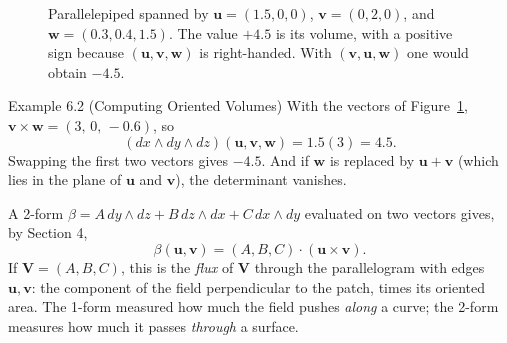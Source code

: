 \documentclass[11pt,letterpaper]{article}
\newcommand{\manualsubsection}[1]{%
  \Needspace{5\baselineskip}%
  \par\vspace{0.2cm}\noindent{\bfseries\color{orangeacc} #1}\par\nobreak
  \vspace{0.12cm}
}
\begin{document}
\begin{figure}[htbp]
\centering
{}
\caption{Parallelepiped spanned by $\mathbf{u}=(1.5,0,0)$, $\mathbf{v}=(0,2,0)$,
and $\mathbf{w}=(0.3,0.4,1.5)$. The value $+4.5$ is its volume, with a positive
sign because $(\mathbf{u},\mathbf{v},\mathbf{w})$ is right-handed. With
$(\mathbf{v},\mathbf{u},\mathbf{w})$ one would obtain $-4.5$.}
\label{fig:volumen}
\end{figure}
\FloatBarrier

\begin{examplebox}{Example 6.2 (Computing Oriented Volumes)}
With the vectors of Figure~\ref{fig:volumen}, $\mathbf{v}\times\mathbf{w}=(3,\,0,\,-0.6)$, so
\[
  (dx\wedge dy\wedge dz)(\mathbf{u},\mathbf{v},\mathbf{w})=1.5(3)=4.5 .
\]
Swapping the first two vectors gives $-4.5$. And if $\mathbf{w}$ is replaced by
$\mathbf{u}+\mathbf{v}$ (which lies in the plane of $\mathbf{u}$ and
$\mathbf{v}$), the determinant vanishes.
\end{examplebox}

\manualsubsection{A 2-Form Also Measures Something: Flux}
A 2-form $\beta=A\,dy\wedge dz+B\,dz\wedge dx+C\,dx\wedge dy$ evaluated on two
vectors gives, by Section 4,
\begin{equation}
  \beta(\mathbf{u},\mathbf{v})=(A,B,C)\cdot(\mathbf{u}\times\mathbf{v}).
\end{equation}
If $\mathbf{V}=(A,B,C)$, this is the \emph{flux} of $\mathbf{V}$ through the
parallelogram with edges $\mathbf{u},\mathbf{v}$: the component of the field
perpendicular to the patch, times its oriented area. The 1-form measured how
much the field pushes \emph{along} a curve; the 2-form measures how much it
passes \emph{through} a surface.
\end{document}
